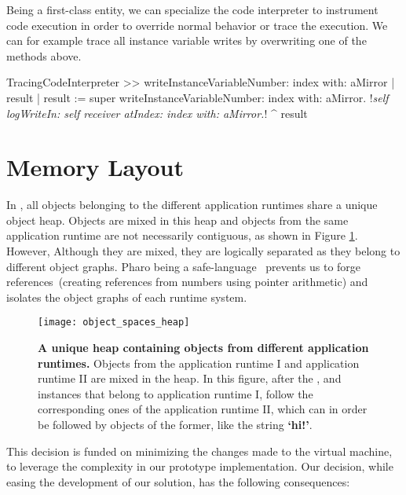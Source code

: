 Being a first-class entity, we can specialize the code interpreter to instrument code execution in order to override normal behavior or trace the execution. We can for example trace all instance variable writes by overwriting one of the methods above.

\begin{code}
TracingCodeInterpreter >> writeInstanceVariableNumber: index with: aMirror
    | result |
    result := super writeInstanceVariableNumber: index with: aMirror.
    !\emph{self logWriteIn: self receiver atIndex: index with: aMirror.}!
    ^ result
\end{code}

\section{\Vtt Memory Layout} \label{sec:memory}

In \Vtt, all objects belonging to the different application runtimes share a unique object heap. Objects are mixed in this heap and objects from the same application runtime are not necessarily contiguous, as shown in Figure \ref{fig:heap}. However, Although they are mixed, they are logically separated as they belong to different object graphs. Pharo being a safe-language~\cite{Hawb98a,Hawb02a} prevents us to forge references~(\ie creating references from numbers using pointer arithmetic) and isolates the object graphs of each runtime system.

\begin{figure}[ht]
\begin{center}
\texttt{[image: object\_spaces\_heap]}
\caption{\textbf{A unique heap containing objects from different application runtimes.} Objects from the application runtime I and application runtime II are mixed in the heap. In this figure, after the ,  and  instances that belong to application runtime I, follow the corresponding ones of the application runtime II, which can in order be followed by objects of the former, like the string \textbf{`hi!'}. \label{fig:heap}}
\end{center}
\end{figure}

This decision is funded on minimizing the changes made to the virtual machine, to leverage the complexity in our prototype implementation. Our decision, while easing the development of our solution, has the following consequences:

